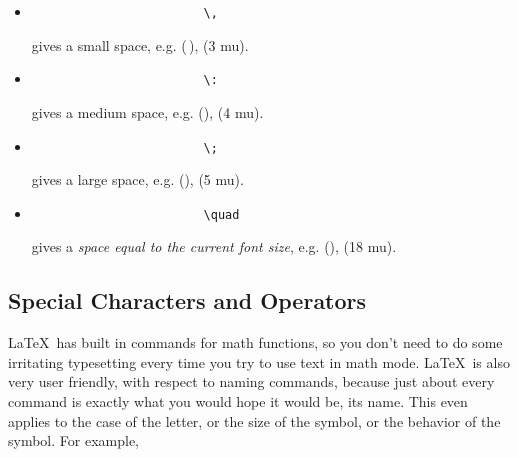 \documentclass[11pt,letterpaper,twoside,titlepage]{article}
\newcommand{\latex}{\LaTeX \ }
\begin{document}
			\begin{itemize}
			
				\item 
				
					\begin{verbatim}
						\,
					\end{verbatim}
					
					gives a small space, e.g. (\,), (3 mu).
					
				\item 
				
					\begin{verbatim}
						\:
					\end{verbatim}
					
					gives a medium space, e.g. (\:), (4 mu).
					
				\item 
				
					\begin{verbatim}
						\;
					\end{verbatim}
					
					gives a large space, e.g. (\;), (5 mu).
					
				\item 
				
					\begin{verbatim}
						\quad
					\end{verbatim}
					
					gives a \emph{space equal to the current font size}, e.g. (\quad), (18 mu).

			\end{itemize}
			
		\subsection{Special Characters and Operators}
		
			\latex has built in commands for math functions, so you don't need to do some irritating typesetting every time you try to use text in math mode.  \latex is also very user friendly, with respect to naming commands, because just about every command is exactly what you would hope it would be, its name.  This even applies to the case of the letter, or the size of the symbol, or the behavior of the symbol.  For example, 
			
\end{document}
